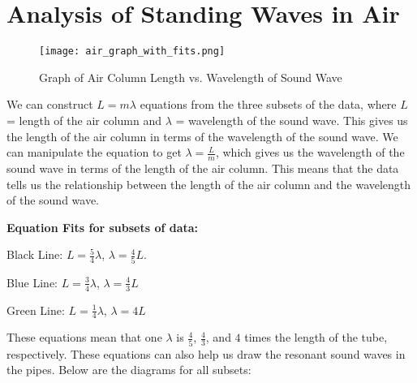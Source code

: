 \documentclass[11pt,twoside]{article}
\begin{document}

\section{Analysis of Standing Waves in Air}

\begin{figure}[H]
    \centering
    \texttt{[image: air\_graph\_with\_fits.png]}
    \caption{Graph of Air Column Length vs. Wavelength of Sound Wave}
\end{figure}
We can construct $L = m\lambda$ equations from the three subsets of the data, where $L$ = length of the air column and $\lambda$ = wavelength of the sound wave. This gives us the length of the air column in terms of the wavelength of the sound wave. We can manipulate the equation to get $\lambda = \frac{L}{m}$, which gives us the wavelength of the sound wave in terms of the length of the air column. This means that the data tells us the relationship between the length of the air column and the wavelength of the sound wave.
 
\textbf{Equation Fits for subsets of data:}

Black Line: $L =\frac{5}{4}\lambda$, $\lambda = \frac{4}{5}L$. 

Blue Line: $L =\frac{3}{4}\lambda$, $\lambda = \frac{4}{3}L$

Green Line: $L = \frac{1}{4}\lambda$, $\lambda = 4L$

These equations mean that one $\lambda$ is $\frac{4}{5}$, $\frac{4}{3}$, and $4$ times the length of the tube, respectively. These equations can also help us draw the resonant sound waves in the pipes. Below are the diagrams for all subsets:




\end{document}
